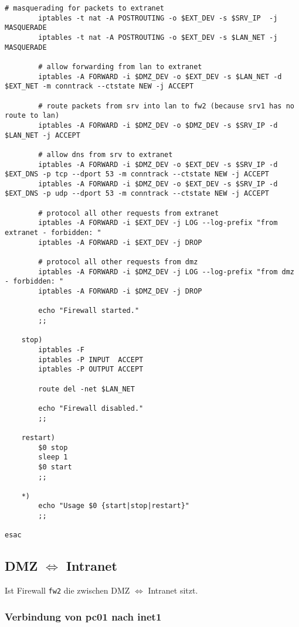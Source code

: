 \begin{lstlisting}[label=lst:masq,caption={Masquerading.}]
        # masquerading for packets to extranet
        iptables -t nat -A POSTROUTING -o $EXT_DEV -s $SRV_IP  -j MASQUERADE
        iptables -t nat -A POSTROUTING -o $EXT_DEV -s $LAN_NET -j MASQUERADE

        # allow forwarding from lan to extranet
        iptables -A FORWARD -i $DMZ_DEV -o $EXT_DEV -s $LAN_NET -d $EXT_NET -m conntrack --ctstate NEW -j ACCEPT

        # route packets from srv into lan to fw2 (because srv1 has no route to lan)
        iptables -A FORWARD -i $DMZ_DEV -o $DMZ_DEV -s $SRV_IP -d $LAN_NET -j ACCEPT

        # allow dns from srv to extranet
        iptables -A FORWARD -i $DMZ_DEV -o $EXT_DEV -s $SRV_IP -d $EXT_DNS -p tcp --dport 53 -m conntrack --ctstate NEW -j ACCEPT
        iptables -A FORWARD -i $DMZ_DEV -o $EXT_DEV -s $SRV_IP -d $EXT_DNS -p udp --dport 53 -m conntrack --ctstate NEW -j ACCEPT

        # protocol all other requests from extranet
        iptables -A FORWARD -i $EXT_DEV -j LOG --log-prefix "from extranet - forbidden: "
        iptables -A FORWARD -i $EXT_DEV -j DROP

        # protocol all other requests from dmz
        iptables -A FORWARD -i $DMZ_DEV -j LOG --log-prefix "from dmz - forbidden: "
        iptables -A FORWARD -i $DMZ_DEV -j DROP

        echo "Firewall started."
        ;;

    stop)
        iptables -F
        iptables -P INPUT  ACCEPT
        iptables -P OUTPUT ACCEPT

        route del -net $LAN_NET

        echo "Firewall disabled."
        ;;

    restart)
        $0 stop
        sleep 1
        $0 start
        ;;

    *)
        echo "Usage $0 {start|stop|restart}"
        ;;

esac
\end{lstlisting}


\subsection{DMZ $\Longleftrightarrow$ Intranet}

Ist Firewall {\tt fw2} die zwischen DMZ $\Longleftrightarrow$ Intranet sitzt.

\subsubsection{Verbindung von pc01 nach inet1}

